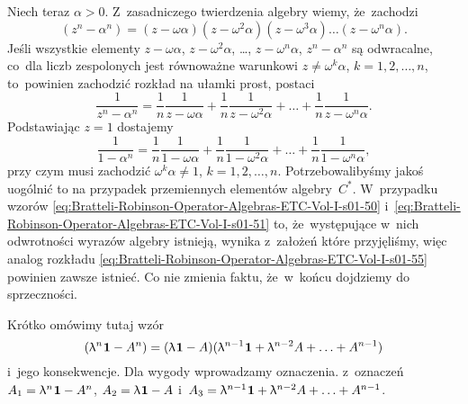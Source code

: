 \documentclass[a4paper,11pt]{article}
\renewcommand{\lambda}{\uplambda}
\begin{document}
Niech teraz $\alpha > 0$. Z~zasadniczego twierdzenia algebry wiemy, że~zachodzi
\begin{equation}
  \label{eq:Bratteli-Robinson-Operator-Algebras-ETC-Vol-I-s01-53}
  ( z^{ n } - \alpha^{ n } ) =
  ( z - \omega \alpha ) ( z - \omega^{ 2 } \alpha ) ( z - \omega^{ 3 } \alpha ) \ldots
  ( z - \omega^{ n } \alpha ).
\end{equation}
Jeśli wszystkie elementy $z - \omega \alpha$, $z - \omega^{ 2 } \alpha$, \ldots, $z - \omega^{ n } \alpha$,
$z^{ n } - \alpha^{ n }$ są odwracalne, co~dla liczb zespolonych jest równoważne
warunkowi $z \neq \omega^{ k } \alpha$,  $k = 1, 2, \ldots, n$, to~powinien zachodzić rozkład
na ułamki prost, postaci
\begin{equation}
  \label{eq:Bratteli-Robinson-Operator-Algebras-ETC-Vol-I-s01-54}
  \frac{ 1 }{ z^{ n } - \alpha^{ n } } =
  \frac{ 1 }{ n } \frac{ 1 }{ z - \omega \alpha } +
  \frac{ 1 }{ n } \frac{ 1 }{ z - \omega^{ 2 } \alpha } + \ldots +
  \frac{ 1 }{ n } \frac{ 1 }{ z - \omega^{ n } \alpha }.
\end{equation}
Podstawiając $z = 1$ dostajemy
\begin{equation}
  \label{eq:Bratteli-Robinson-Operator-Algebras-ETC-Vol-I-s01-55}
  \frac{ 1 }{ 1 - \alpha^{ n } } =
  \frac{ 1 }{ n } \frac{ 1 }{ 1 - \omega \alpha } +
  \frac{ 1 }{ n } \frac{ 1 }{ 1 - \omega^{ 2 } \alpha } + \ldots +
  \frac{ 1 }{ n } \frac{ 1 }{ 1 - \omega^{ n } \alpha },
\end{equation}
przy czym musi zachodzić $\omega^{ k } \alpha \neq 1$, $k = 1, 2, \ldots, n$.
Potrzebowalibyśmy jakoś uogólnić to na przypadek przemiennych elementów
algebry~$C^{ * }$. W~przypadku wzorów
\eqref{eq:Bratteli-Robinson-Operator-Algebras-ETC-Vol-I-s01-50}
i~\eqref{eq:Bratteli-Robinson-Operator-Algebras-ETC-Vol-I-s01-51} to,
że~występujące w~nich odwrotności wyrazów algebry istnieją, wynika z~założeń
które przyjęliśmy, więc analog rozkładu
\eqref{eq:Bratteli-Robinson-Operator-Algebras-ETC-Vol-I-s01-55} powinien
zawsze istnieć. Co nie zmienia faktu, że~w~końcu dojdziemy do sprzeczności.

\VerSpaceFour





\noindent
{} Krótko omówimy tutaj wzór
\begin{equation}
  \label{eq:Bratteli-Robinson-Operator-Algebras-ETC-Vol-I-s01-56}
  ( \lambda^{ n } \HorSpaceOne \UnitAlg - A^{ n } ) =
  ( \lambda \HorSpaceOne \UnitAlg - A )
  ( \lambda^{ n - 1 } \HorSpaceOne \UnitAlg + \lambda^{ n - 2 } A + \ldots +
  A^{ n - 1 } )
\end{equation}
i~jego konsekwencje. Dla wygody wprowadzamy oznaczenia. z~oznaczeń
$A_{ 1 } = \lambda^{ n } \HorSpaceOne \UnitAlg - A^{ n }$,
$A_{ 2 } = \lambda \HorSpaceOne \UnitAlg - A$
i~$A_{ 3 } = \lambda^{ n - 1 } \HorSpaceOne \UnitAlg + \lambda^{ n - 2 } A + \ldots + A^{ n - 1 }$.
\end{document}

